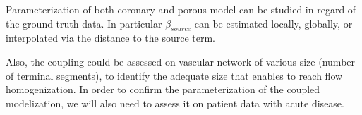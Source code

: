 \documentclass[a4paper, 11pt]{article} %
\begin{document}
Parameterization of both coronary and porous model can be studied in regard of the ground-truth data. In particular $\beta_{source}$ can be estimated locally, globally, or interpolated via the distance to the source term. 

Also, the coupling could be assessed on vascular network of various size (number of terminal segments), to identify the adequate size that enables to reach flow homogenization.
In order to confirm the parameterization of the coupled modelization, we will also need to assess it on patient data with acute disease.







\end{document}
